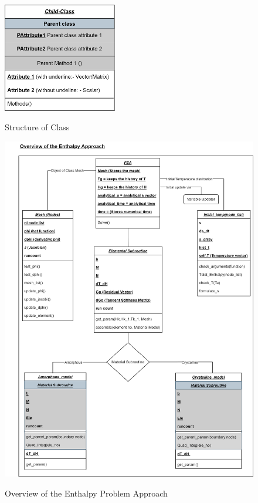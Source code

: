 \begin{figure}[htb]
  \centering
  \includegraphics[width=5cm]{img/Nomenclature_Class.png}\\
  \caption{Structure of Class}
  \label{fig:Structure_of_class}
\end{figure}

\begin{figure}[htb]
  \centering
  \includegraphics[width=14.3cm]{img/Over_View.png}\\
  \caption{Overview of the Enthalpy Problem Approach}
  \label{fig:Initial_temp}
\end{figure}

